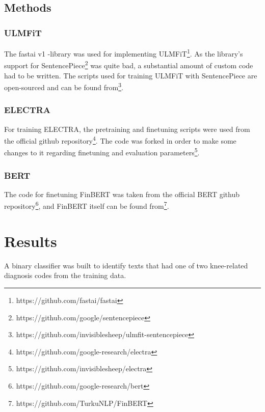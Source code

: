 \subsection{Methods}\label{Methods}
\subsubsection{ULMFiT}\label{ULMFiT}
The fastai v1 -library was used for implementing ULMFiT\footnote{https://github.com/fastai/fastai}.
As the library's support for SentencePiece\footnote{https://github.com/google/sentencepiece} was quite bad, a substantial amount of custom code had to be written.
The scripts used for training ULMFiT with SentencePiece are open-sourced and can be found from\footnote{https://github.com/invisiblesheep/ulmfit-sentencepiece}.

\subsubsection{ELECTRA}\label{ELECTRA}
For training ELECTRA, the pretraining and finetuning scripts were used from the official github repository\footnote{https://github.com/google-research/electra}.
The code was forked in order to make some changes to it regarding finetuning and evaluation parameters\footnote{https://github.com/invisiblesheep/electra}.

\subsubsection{BERT}\label{BERT}
The code for finetuning FinBERT was taken from the official BERT github repository\footnote{https://github.com/google-research/bert}, and FinBERT itself can be found from\footnote{https://github.com/TurkuNLP/FinBERT}.

\section{Results}\label{Results}
A binary classifier was built to identify texts that had one of two knee-related diagnosis codes from the training data.

